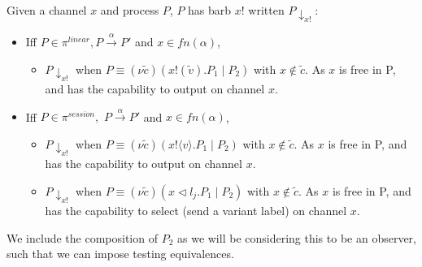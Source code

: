 \begin{definition} [Observations]
Given a channel $x$ and process $P$, $P$ has barb $x!$ written $P \downarrow_{x!}$:
    \begin{itemize}
    \item Iff $P \in \pi^{linear}, P \xrightarrow{\alpha} P'$ and $x \in fn(\alpha)$, 
    \begin{itemize}
        \item $P \downarrow_{x!}$ when $P \equiv (\nu \widetilde{c}) (x!(\widetilde{v}).P_1 \mid P_2)$ with $x \not \in \widetilde{c}$. As $x$ is free in P, and has the capability to output on channel $x$.
    \end{itemize}
    \item Iff $P \in \pi^{session},$ $P \xrightarrow{\alpha} P'$ and $x \in fn(\alpha)$, 
    \begin{itemize}
        \item $P \downarrow_{x!}$ when $P \equiv (\nu \widetilde{c}) (x!\langle v \rangle .P_1 \mid P_2)$ with $x \not \in \widetilde{c}$. As $x$ is free in P, and has the capability to output on channel $x$.
        \item $P \downarrow_{x!}$ when $P \equiv (\nu \widetilde{c}) (x \vartriangleleft l_j.P_1 \mid P_2)$ with $x \not \in \widetilde{c}$. As $x$ is free in P, and has the capability to select (send a variant label) on channel $x$.
    \end{itemize}
    \end{itemize}
    \label{def:observations}
\end{definition}

We include the composition of $P_2$ as we will be considering this to be an observer, such that we can impose testing equivalences. 



